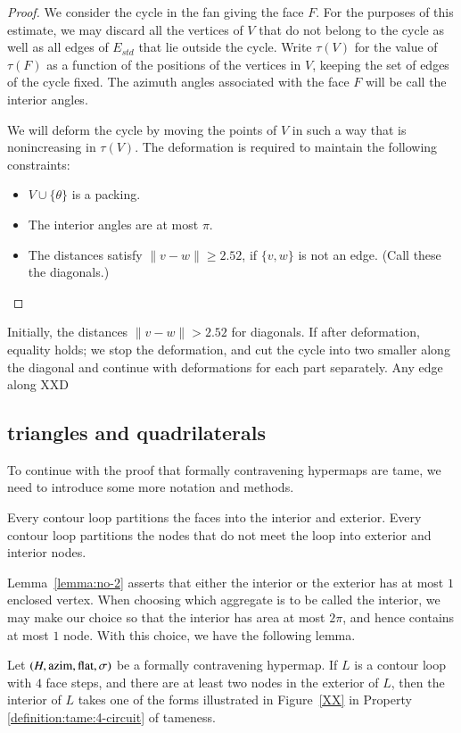 \begin{proof}  We consider the cycle in the fan
giving the face $F$.  For the purposes of this
estimate, we may discard all the vertices of $V$
that do not belong to the cycle as well as all edges
of $E_{std}$ that lie outside the cycle.
Write $\tau(V)$ for the value of $\tau(F)$ as a
function of the positions of the vertices in $V$,
keeping the set of edges of the cycle fixed.  The
azimuth angles associated with the face $F$ will be
call the interior angles.  

We will deform the cycle by moving the points of $V$ in such a way that is nonincreasing in $\tau(V)$.
The deformation is required to maintain the following
constraints:
\begin{itemize}
\item $V\cup\{\theta\}$ is a packing.
\item The interior angles are at most $\pi$.
\item The distances satisfy $\|v-w\|\ge 2.52$, if $\{v,w\}$ is
not an edge.  (Call these the diagonals.)
\end{itemize}
\end{proof}

Initially, the distances $\|v-w\|>2.52$ for diagonals.
If after deformation, equality holds; we stop the deformation, and cut the cycle into two smaller along the diagonal
and continue with deformations for each part separately.
Any edge along XXD


\subsection{triangles and quadrilaterals}


\label{sec:2.2}  To continue with the proof that formally
contravening hypermaps are tame, we need to introduce some more
notation and methods.



Every contour loop partitions the faces into the interior and
exterior.  Every contour loop partitions the nodes that do not meet
the loop into exterior and interior nodes.
%

Lemma~\ref{lemma:no-2} asserts that either the interior or the
exterior has at most $1$ enclosed vertex.   When choosing which
aggregate is to be called the interior, we may make our choice so
that the interior has area at most $2\pi$, and hence contains at
most $1$ node. With this choice, we have the following lemma.

\begin{lemma}
Let $(H,{\operatorname{azim}},\operatorname{flat},\sigma)$ be a formally contravening hypermap. If
$L$ is a contour loop with $4$ face steps, and there are at least
two nodes in the exterior of $L$, then the interior of $L$ takes one
of the forms illustrated in Figure~\ref{XX} in Property
    \ref{definition:tame:4-circuit} of tameness.
\end{lemma}

